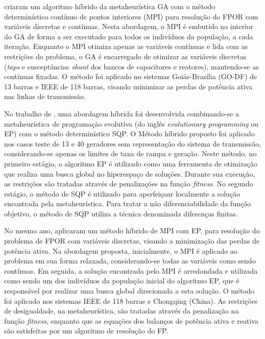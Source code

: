  criaram um algoritmo híbrido da metaheurística GA com o método determinístico contínuo de pontos interiores (MPI) para resolução do FPOR com variáveis discretas e contínuas. Nesta abordagem, o MPI é embutido no interior do GA de forma a ser executado para todos os indivíduos da população, a cada iteração. Enquanto o MPI otimiza apenas as variáveis contínuas e lida com as restrições do problema, o GA é encarregado de otimizar as variáveis discretas (\emph{taps} e susceptâncias \emph{shunt} dos bancos de capacitores e reatores), mantendo-se as contínuas fixadas. O método foi aplicado no sistemas Goiás-Brasília (GO-DF) de 13 barras e IEEE de 118 barras, visando minimizar as perdas de potência ativa nas linhas de transmissão.

No trabalho de , uma abordagem híbrida foi desenvolvida combinando-se a metaheurística de programação evolutiva (do inglês \emph{evolutionary programming} ou EP) com o método determinístico SQP. O Método híbrido proposto foi aplicado nos casos teste de 13 e 40 geradores sem representação do sistema de transmissão, considerando-se apenas os limites de taxa de rampa e geração. Neste método, no primeiro estágio, o algoritmo EP é utilizado como uma ferramenta de otimização que realiza uma busca global no hiperespaço de soluções. Durante sua execução, as restrições são tratadas através de penalizações na função \emph{fitness}. No segundo estágio, o método de SQP é utilizado para aperfeiçoar localmente a solução encontrada pela metaheurística. Para tratar a não diferenciabilidade da função objetivo, o método de SQP utiliza a técnica denominada diferenças finitas.


No mesmo ano,  aplicaram um método híbrido de MPI com EP, para resolução do problema de FPOR com variáveis discretas, visando a minimização das perdas de potência ativa. Na abordagem proposta, inicialmente, o MPI é aplicado ao problema em sua forma relaxada, considerando-se todas as variáveis como sendo contínuas. Em seguida, a solução encontrada pelo MPI é arredondada e utilizada como sendo um dos indivíduos da população inicial do algoritmo EP, que é responsável por realizar uma busca global direcionada a esta solução. O método foi aplicado nos sistemas IEEE de 118 barras e Chongqing (China). As restrições de desigualdade, na metaheurística, são tratadas através da penalização na função \emph{fitness}, enquanto que as equações dos balanços de potência ativa e reativa são satisfeitas por um algoritmo de resolução do FP.


